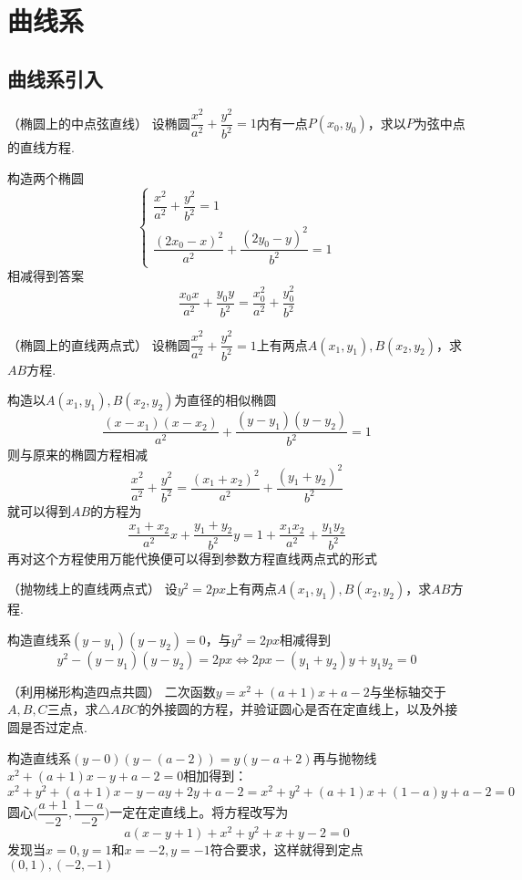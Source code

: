 \chapter{曲线系}
\section{曲线系引入}
\begin{example}{（椭圆上的中点弦直线）}{}
设椭圆$\dfrac{x^2}{a^2}+\dfrac{y^2}{b^2}=1$内有一点$P(x_0,y_0)$，求以$P$为弦中点的直线方程.
\end{example}
\begin{solution}
    构造两个椭圆\[\begin{cases}\dfrac{x^2}{a^2}+\dfrac{y^2}{b^2}=1\\\dfrac{(2x_0-x)^2}{a^2}+\dfrac{(2y_0-y)^2}{b^2}=1\end{cases}\]
    相减得到答案\[\dfrac{x_0x}{a^2}+\dfrac{y_0y}{b^2}=\dfrac{x_0^2}{a^2}+\dfrac{y_0^2}{b^2}\]
\end{solution}
\begin{exmaple}{（椭圆上的直线两点式）}{}
设椭圆$\dfrac{x^2}{a^2}+\dfrac{y^2}{b^2}=1$上有两点$A(x_1,y_1),B(x_2,y_2)$，求$AB$方程.
\end{exmaple}
\begin{solution}
    构造以$A(x_1,y_1),B(x_2,y_2)$为直径的相似椭圆\[\dfrac{(x-x_1)(x-x_2)}{a^2}+\dfrac{(y-y_1)(y-y_2)}{b^2}=1\]则与原来的椭圆方程相减
    \[\dfrac{x^2}{a^2}+\dfrac{y^2}{b^2}=\dfrac{(x_1+x_2)^2}{a^2}+\dfrac{(y_1+y_2)^2}{b^2}\]就可以得到$AB$的方程为
    \[\dfrac{x_1+x_2}{a^2}x+\dfrac{y_1+y_2}{b^2}y=1+\dfrac{x_1x_2}{a^2}+\dfrac{y_1y_2}{b^2}\]
    再对这个方程使用万能代换便可以得到参数方程直线两点式的形式
\end{solution}
\begin{example}{（抛物线上的直线两点式）}{}
设$y^2=2px$上有两点$A(x_1,y_1),B(x_2,y_2)$，求$AB$方程.
\end{example}
\begin{solution}
    构造直线系$(y-y_1)(y-y_2)=0$，与$y^2=2px$相减得到\[y^2-(y-y_1)(y-y_2)=2px\Leftrightarrow 2px-(y_1+y_2)y+y_1y_2=0\]
\end{solution}
\begin{example}{（利用梯形构造四点共圆）}{}
    二次函数$y=x^2+(a+1)x+a-2$与坐标轴交于$A,B,C$三点，求$\triangle ABC$的外接圆的方程，并验证圆心是否在定直线上，以及外接圆是否过定点.
\end{example}
\begin{solution}
    构造直线系$(y-0)(y-(a-2))=y(y-a+2)$再与抛物线$x^2+(a+1)x-y+a-2=0$相加得到：
    \[x^2+y^2+(a+1)x-y-ay+2y+a-2=x^2+y^2+(a+1)x+(1-a)y+a-2=0\]
    圆心$\bigg(\dfrac{a+1}{-2},\dfrac{1-a}{-2}\bigg)$一定在定直线上。将方程改写为
    \[a(x-y+1)+x^2+y^2+x+y-2=0\]发现当$x=0,y=1$和$x=-2,y=-1$符合要求，这样就得到定点$(0,1),(-2,-1)$
\end{solution}
